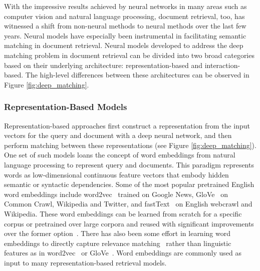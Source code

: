 With the impressive results achieved by neural networks in many areas such as computer vision and natural language processing, document retrieval, too, has witnessed a shift from non-neural methods to neural methods over the last few years.
Neural models have especially been instrumental in facilitating semantic matching in document retrieval.
Neural models developed to address the deep matching problem in document retrieval can be divided into two broad categories based on their underlying architecture: representation-based and interaction-based.
The high-level differences between these architectures can be observed in Figure \ref{fig:deep_matching}.

\subsubsection{Representation-Based Models}

Representation-based approaches first construct a representation from the input vectors for the query and document with a deep neural network, and then perform matching between these representations (see  Figure \ref{fig:deep_matching}).
One set of such models loans the concept of word embeddings from natural language processing to represent query and documents.
This paradigm represents words as low-dimensional continuous feature vectors that embody hidden semantic or syntactic dependencies.
Some of the most popular pretrained English word embeddings include word2vec~\cite{mikolov2013distributed} trained on  Google News, GloVe~\cite{pennington2014glove} on Common Crawl, Wikipedia and Twitter, and fastText~\cite{bojanowski2017enriching} on English webcrawl and Wikipedia.
These word embeddings can be learned from scratch for a specific corpus or pretrained over large corpora and reused with significant improvements over the former option~\cite{turian2010word}.
There has also been some effort in learning word embeddings to directly capture relevance matching~\cite{DBLP:journals/corr/ZamaniC17, ganguly2015word} rather than linguistic features as in word2vec~\cite{mikolov2013distributed} or GloVe~\cite{pennington2014glove}.
Word embeddings are commonly used as input to many representation-based retrieval models.

